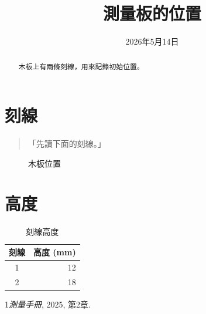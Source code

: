 \documentclass{article}
\begin{document}
\title{測量板的位置}\author{}\date{2026年5月14日}\maketitle
\begin{abstract}木板上有兩條刻線，用來記錄初始位置。\end{abstract}
\tableofcontents
\section{刻線}\begin{quote}「先讀下面的刻線。」\end{quote}
\begin{figure}[ht]\centering\fbox{\rule{0pt}{8mm}\rule{33mm}{0pt}}\caption{木板位置}\end{figure}
\section{高度}
\begin{table}[ht]\centering\begin{tabular}{cr}刻線&高度 (mm)\\\hline 1&12\\2&18\end{tabular}\caption{刻線高度}\end{table}
\begin{thebibliography}{1}\emph{測量手冊}, 2025, 第2章.\end{thebibliography}
\end{document}
